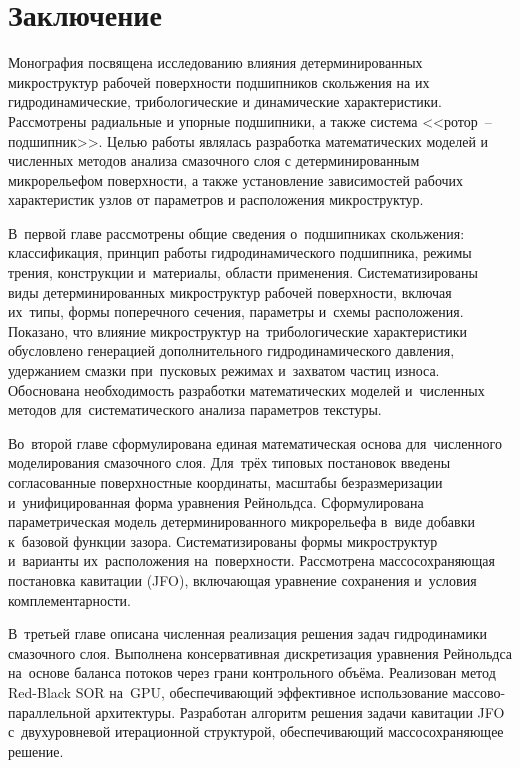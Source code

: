 \chapter*{Заключение}

Монография посвящена исследованию влияния детерминированных
микроструктур рабочей поверхности подшипников скольжения на их
гидродинамические, трибологические и динамические характеристики.
Рассмотрены радиальные и упорные подшипники, а также система
<<ротор~-- подшипник>>. Целью работы являлась разработка
математических моделей и численных методов анализа смазочного
слоя с детерминированным микрорельефом поверхности, а также
установление зависимостей рабочих характеристик узлов
от параметров и расположения микроструктур.

В~первой главе рассмотрены общие сведения о~подшипниках скольжения: классификация, принцип работы гидродинамического подшипника, режимы трения, конструкции и~материалы, области применения. Систематизированы виды детерминированных микроструктур рабочей поверхности, включая их~типы, формы поперечного сечения, параметры и~схемы расположения. Показано, что влияние микроструктур на~трибологические характеристики обусловлено генерацией дополнительного гидродинамического давления, удержанием смазки при~пусковых режимах и~захватом частиц износа. Обоснована необходимость разработки математических моделей и~численных методов для~систематического анализа параметров текстуры.

Во~второй главе сформулирована единая математическая основа для~численного моделирования смазочного слоя. Для~трёх типовых постановок введены согласованные поверхностные координаты, масштабы безразмеризации и~унифицированная форма уравнения Рейнольдса. Сформулирована параметрическая модель детерминированного микрорельефа в~виде добавки к~базовой функции зазора. Систематизированы формы микроструктур и~варианты их~расположения на~поверхности. Рассмотрена массосохраняющая постановка кавитации (JFO), включающая уравнение сохранения и~условия комплементарности.

В~третьей главе описана численная реализация решения задач гидродинамики смазочного слоя. Выполнена консервативная дискретизация уравнения Рейнольдса на~основе баланса потоков через грани контрольного объёма. Реализован метод Red-Black SOR на~GPU, обеспечивающий эффективное использование массово-параллельной архитектуры. Разработан алгоритм решения задачи кавитации JFO с~двухуровневой итерационной структурой, обеспечивающий массосохраняющее решение.

